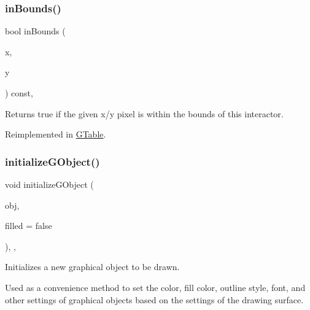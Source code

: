 \subsubsection{\texorpdfstring{in\+Bounds()}{inBounds()}\hspace{0.1cm}{\footnotesize\ttfamily [2/2]}}
{\footnotesize\ttfamily bool in\+Bounds (\begin{DoxyParamCaption}\item[{int}]{x,  }\item[{int}]{y }\end{DoxyParamCaption}) const\hspace{0.3cm}{\ttfamily [virtual]}, {\ttfamily [inherited]}}



Returns true if the given x/y pixel is within the bounds of this interactor. 



Reimplemented in \mbox{\hyperlink{classGTable_afa6b6241d2f7af75f2d1345f46acfc35}{G\+Table}}.

\mbox{\label{classGDrawingSurface_a814498efebc5586645159cd22990cf61}} 
\subsubsection{\texorpdfstring{initialize\+G\+Object()}{initializeGObject()}\hspace{0.1cm}{\footnotesize\ttfamily [1/2]}}
{\footnotesize\ttfamily void initialize\+G\+Object (\begin{DoxyParamCaption}\item[{\mbox{\hyperlink{classGObject}{G\+Object}} \&}]{obj,  }\item[{bool}]{filled = {\ttfamily false} }\end{DoxyParamCaption})\hspace{0.3cm}{\ttfamily [protected]}, {\ttfamily [virtual]}, {\ttfamily [inherited]}}



Initializes a new graphical object to be drawn. 

Used as a convenience method to set the color, fill color, outline style, font, and other settings of graphical objects based on the settings of the drawing surface. \mbox{\label{classGDrawingSurface_a43e6bc951980da061ddc40407daee227}} 
